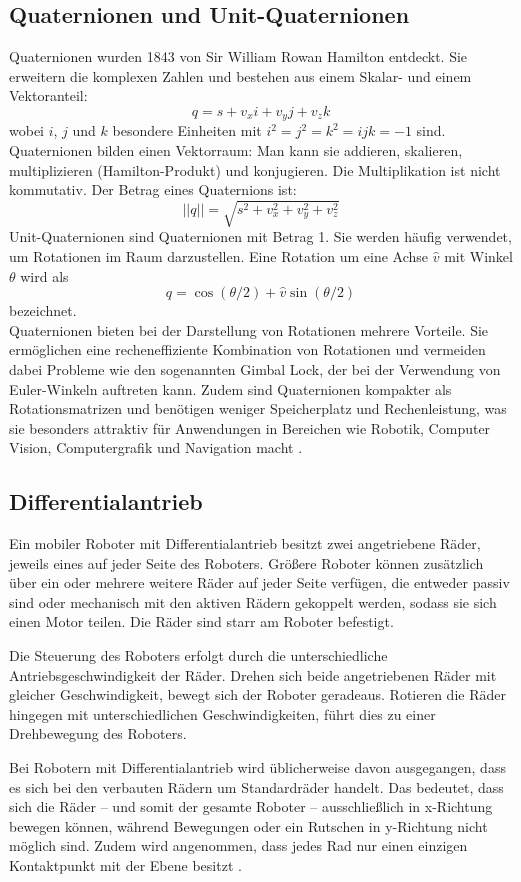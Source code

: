 \subsection{Quaternionen und Unit-Quaternionen}
Quaternionen wurden 1843 von Sir William Rowan Hamilton entdeckt. Sie erweitern die komplexen Zahlen und bestehen aus einem Skalar- und einem Vektoranteil:
 \[
 q=s+v_xi+v_yj+v_zk
 \]
 wobei $i$, $j$ und $k$ besondere Einheiten mit $i^2=j^2=k^2=ijk=-1$ sind.
 Quaternionen bilden einen Vektorraum: Man kann sie addieren, skalieren, multiplizieren (Hamilton-Produkt) und konjugieren. Die Multiplikation ist nicht kommutativ. Der Betrag eines Quaternions ist:
 \[
 ||q||=\sqrt{s^2+v_x^2+v_y^2+v_z^2}
 \]
 Unit-Quaternionen sind Quaternionen mit Betrag 1. Sie werden häufig verwendet, um Rotationen im Raum darzustellen. Eine Rotation um eine Achse $\hat{v}$ mit Winkel $\theta$ wird als
 \[
 q=\cos(\theta/2)+\hat{v} \sin(\theta/2)
 \]
bezeichnet.\\
 Quaternionen bieten bei der Darstellung von Rotationen mehrere Vorteile.
 Sie ermöglichen eine recheneffiziente Kombination von Rotationen und vermeiden dabei Probleme wie den sogenannten Gimbal Lock, der bei der Verwendung von Euler-Winkeln auftreten kann.
 Zudem sind Quaternionen kompakter als Rotationsmatrizen und benötigen weniger Speicherplatz und Rechenleistung,
 was sie besonders attraktiv für Anwendungen in Bereichen wie Robotik, Computer Vision, Computergrafik und Navigation macht \cite[59-61]{Robotics_Vision_and_Control}.

\subsection{Differentialantrieb}
Ein mobiler Roboter mit Differentialantrieb besitzt zwei angetriebene Räder, jeweils eines auf jeder Seite des Roboters.
Größere Roboter können zusätzlich über ein oder mehrere weitere Räder auf jeder Seite verfügen, die entweder passiv sind oder mechanisch mit den aktiven Rädern gekoppelt werden,
sodass sie sich einen Motor teilen. Die Räder sind starr am Roboter befestigt.

Die Steuerung des Roboters erfolgt durch die unterschiedliche Antriebsgeschwindigkeit der Räder.
Drehen sich beide angetriebenen Räder mit gleicher Geschwindigkeit, bewegt sich der Roboter geradeaus.
Rotieren die Räder hingegen mit unterschiedlichen Geschwindigkeiten, führt dies zu einer Drehbewegung des Roboters.

Bei Robotern mit Differentialantrieb wird üblicherweise davon ausgegangen, dass es sich bei den verbauten Rädern um Standardräder handelt.
Das bedeutet, dass sich die Räder – und somit der gesamte Roboter – ausschließlich in x-Richtung bewegen können, während Bewegungen oder ein Rutschen in y-Richtung nicht möglich sind.
Zudem wird angenommen, dass jedes Rad nur einen einzigen Kontaktpunkt mit der Ebene besitzt
\cite[140-141]{Robotics_Vision_and_Control}
\cite[107]{mobile_roboter}.


